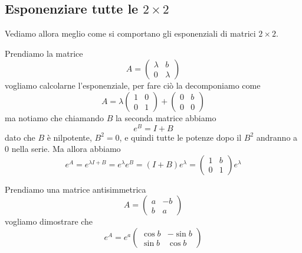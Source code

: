\documentclass[11pt]{scrartcl}
\begin{document}
	\subsection{Esponenziare tutte le $2\times 2$}
	Vediamo allora meglio come si comportano gli esponenziali di matrici $2\times 2$. 	\begin{example}
		Prendiamo la matrice 
		$$A=
		\begin{pmatrix}
			\lambda & b \\
			0 & \lambda
		\end{pmatrix}
		$$
		vogliamo calcolarne l'esponenziale, per fare ciò la decomponiamo come
		$$A=\lambda \begin{pmatrix}
			1 & 0 \\
			0 & 1
		\end{pmatrix}+
		\begin{pmatrix}
			0 & b \\
			0 & 0 
		\end{pmatrix}
		$$
		ma notiamo che chiamando $B$ la seconda matrice abbiamo
		$$e^{B}=I+B$$
		dato che $B$ è nilpotente, $B^2=0$, e quindi tutte le potenze dopo il $B^2$ andranno a $0$ nella serie. Ma allora abbiamo
		$$e^A=e^{\lambda I + B}=e^\lambda e^B=(I+B)e^\lambda=\begin{pmatrix}
			1 & b \\
			0 & 1
		\end{pmatrix}e^\lambda$$
	\end{example}
	\begin{example}[Antisimmetriche]
		Prendiamo una matrice antisimmetrica
		$$A=
		\begin{pmatrix}
			a & -b \\
			b & a
		\end{pmatrix}
		$$
		vogliamo dimostrare che 
		$$e^A=e^a\begin{pmatrix}
			\cos b & -\sin b \\
			\sin b & \cos b
		\end{pmatrix}$$
	\end{example}
\end{document}
